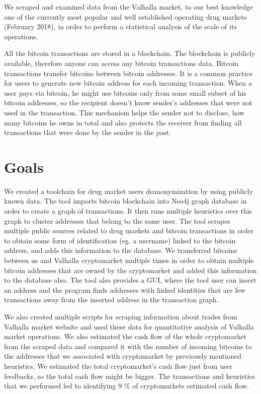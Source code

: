 \documentclass[
  digital, %
  table,   %
  lof,     %
  lot,     %
  oneside
]{fithesis3}
\begin{document}
We scraped and examined data from the Valhalla market,
 to our best knowledge one of the currently most popular and well established operating drug markets (February 2018),
in order to perform a statistical analysis of the scale of its operations.

All the bitcoin transactions are stored in a blockchain. The blockchain is
publicly available, therefore anyone can access any bitcoin transactions data.
Bitcoin transactions transfer bitcoins between bitcoin addresses. It is a common practice for users
to generate new bitcoin address for each incoming transaction.
When a user pays via bitcoin, he might use bitcoins only from some small subset of his bitcoin addresses,
so the recipient doesn't know sender's addresses that were not used in the transaction.
This mechanism helps the sender not to disclose, how many bitcoins he owns in total and also
protects the receiver from finding all transactions that were done by the sender in the past.

\section{Goals}

We created a toolchain for drug market users deanonymization by using publicly known data.
The tool imports bitcoin blockchain into Neo4j graph database in order to create a graph of transactions.
It then runs multiple heuristics over this graph to cluster addresses that belong to the same user.
The tool scrapes multiple public sources related to drug markets and bitcoin transactions in order
to obtain some form of identification (eg. a username) linked to the bitcoin address, and adds this information to the database.
We transferred bitcoins between us and Valhalla cryptomarket multiple times in order to obtain
multiple bitcoin addresses that are owned by the cryptomarket and added this information to the database also.
The tool also provides a GUI, where the tool user can insert an address and the program finds addresses with linked identities
that are few transactions away from the inserted address in the transaction graph.

We also created multiple scripts for scraping information about trades from Valhalla market website
and used these data for quantitative analysis of Valhalla market operations.
We also estimated the cash flow of the whole cryptomarket from the scraped data and compared
it with the number of incoming bitcoins to the addresses that we associated with cryptomarket
by previously mentioned heuristics.
We estimated the total cryptomarket's cash flow just from user feedbacks, so the total cash flow might be bigger.
The transactions and heuristics that we performed led to identifying 9 \% of cryptomarkets estimated cash flow.
\end{document}
